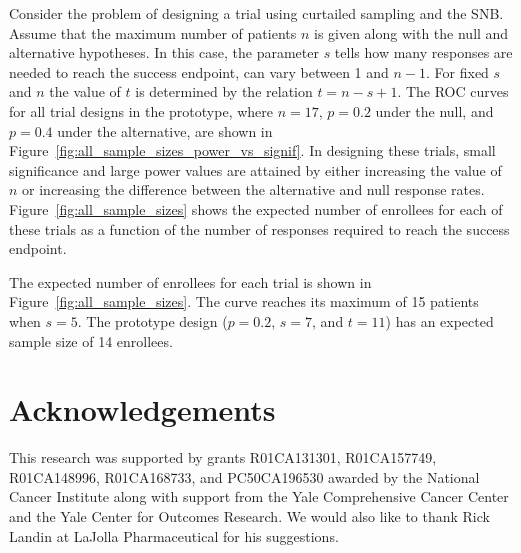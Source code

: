 \documentclass[sii]{ipart}
\begin{document}
Consider the problem of designing a trial using curtailed sampling and the SNB. Assume that the maximum number of patients $n$ is given along with the null and alternative hypotheses. In this case, the parameter $s$ tells how many responses are needed to reach the success endpoint, can vary between 1 and $n-1$. For fixed $s$ and $n$  the value of $t$ is determined by the relation $t=n-s+1$. The ROC curves for all trial designs in the prototype, where $n=17$, $p=0.2$ under the null, and $p=0.4$ under the alternative, are shown in Figure~\ref{fig:all_sample_sizes_power_vs_signif}. In designing these trials, small significance and large power values are attained by either increasing the value of $n$ or increasing the difference between the alternative and null response rates. Figure~\ref{fig:all_sample_sizes} shows the expected number of enrollees for each of these trials as a function of the number of responses required to reach the success endpoint.


The expected number of enrollees for each trial is shown in Figure~\ref{fig:all_sample_sizes}. The curve reaches its maximum of 15 patients when $s=5$. The prototype design ($p=0.2$, $s=7$, and $t=11$) has an expected sample size of 14 enrollees.

\section*{Acknowledgements}
This research was supported by grants R01CA131301, 
R01CA157749, R01CA148996, R01CA168733, and PC50CA196530 awarded by the 
National Cancer Institute along with support from the Yale Comprehensive Cancer 
Center and the Yale Center for Outcomes Research. We would also like 
to thank Rick Landin at LaJolla Pharmaceutical for his suggestions.
\end{document}
